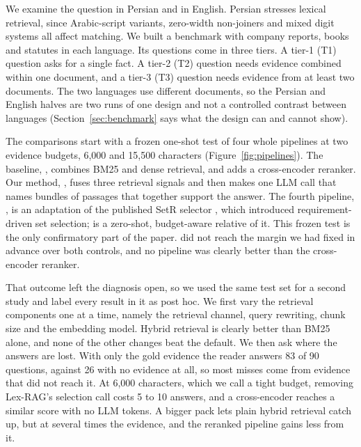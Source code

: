 We examine the question in Persian and in English. Persian stresses lexical retrieval, since Arabic-script variants, zero-width non-joiners and mixed digit systems all affect matching. We built a benchmark with company reports, books and statutes in each language. Its questions come in three tiers. A tier-1 (T1) question asks for a single fact. A tier-2 (T2) question needs evidence combined within one document, and a tier-3 (T3) question needs evidence from at least two documents. The two languages use different documents, so the Persian and English halves are two runs of one design and not a controlled contrast between languages (Section~\ref{sec:benchmark} says what the design can and cannot show).

The comparisons start with a frozen one-shot test of four whole pipelines at two evidence budgets, 6,000 and 15,500 characters (Figure~\ref{fig:pipelines}). The baseline, \hybrid, combines BM25 and dense retrieval, and \hr{} adds a cross-encoder reranker. Our method, \lexb{}, fuses three retrieval signals and then makes one LLM call that names bundles of passages that together support the answer. The fourth pipeline, \setr, is an adaptation of the published SetR selector \citep{lee2025setr}, which introduced requirement-driven set selection; \lexb{} is a zero-shot, budget-aware relative of it. This frozen test is the only confirmatory part of the paper. \lexb{} did not reach the margin we had fixed in advance over both controls, and no pipeline was clearly better than the cross-encoder reranker.

That outcome left the diagnosis open, so we used the same test set for a second study and label every result in it as post hoc. We first vary the retrieval components one at a time, namely the retrieval channel, query rewriting, chunk size and the embedding model. Hybrid retrieval is clearly better than BM25 alone, and none of the other changes beat the default. We then ask where the answers are lost. With only the gold evidence the reader answers 83 of 90 questions, against 26 with no evidence at all, so most misses come from evidence that did not reach it. At 6,000 characters, which we call a tight budget, removing Lex-RAG's selection call costs 5 to 10 answers, and a cross-encoder reaches a similar score with no LLM tokens. A bigger pack lets plain hybrid retrieval catch up, but at several times the evidence, and the reranked pipeline gains less from it.


